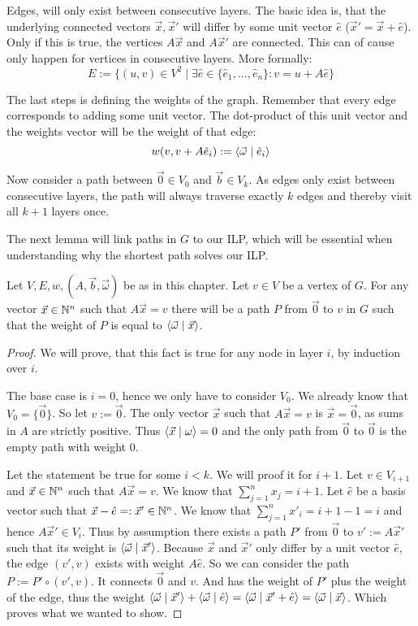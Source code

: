 Edges, will only exist between consecutive layers. The basic idea is, that the underlying connected vectors $\vec x, \vec x'$ will differ by some unit vector $\hat e$ ($\vec x' = \vec x + \hat e$). Only if this is true, the vertices $A\vec x$ and $A\vec x'$ are connected. This can of cause only happen for vertices in consecutive layers. More formally: 
$$E := \{(u, v) \in V^2\mid \exists \hat e \in \{\hat e_1, \dots, \hat e_n\}\colon v = u + A\hat e\}$$

The last steps is defining the weights of the graph. Remember that every edge corresponds to adding some unit vector. The dot-product of this unit vector and the weights vector will be the weight of that edge:
$$w(v, v + A\hat e_i) := \langle \vec \omega \mid \hat e_i \rangle$$

Now consider a path between $\vec 0\in V_0$ and $\vec b \in V_k$. As edges only exist between consecutive layers, the path will always traverse exactly $k$ edges and thereby visit all $k+1$ layers once.

The next lemma will link paths in $G$ to our ILP, which will be essential when understanding why the shortest path solves our ILP.

\begin{lemma}
    Let $V, E, w, (A, \vec b, \vec \omega)$ be as in this chapter. Let $v \in V$ be a vertex of $G$. For any vector $\vec x \in \mathbb{N}^n$ such that $A\vec x = v$ there will be a path $P$ from $\vec 0$ to $v$ in $G$ such that the weight of $P$ is equal to $\langle \vec\omega \mid \vec x \rangle$. 
\end{lemma}
\begin{proof}
    We will prove, that this fact is true for any node in layer $i$, by induction over $i$. 
    
    The base case is $i=0$, hence we only have to consider $V_0$. We already know that $V_0 = \{\vec0\}$. So let $v := \vec 0$. The only vector $\vec x$ such that $A\vec x = v$ is $\vec x = \vec 0$, as sums in $A$ are strictly positive. Thus $\langle \vec x \mid \omega \rangle = 0$ and the only path from $\vec 0$ to $\vec 0$ is the empty path with weight 0.
    
    Let the statement be true for some $i < k$. We will proof it for $i+1$. Let $v \in V_{i+1}$ and $\vec x \in \mathbb{N}^n$ such that $A\vec x = v$. We know that $\sum_{j=1}^n x_j = i+1$. Let $\hat e$ be a basis vector such that $\vec x - \hat e =: \vec x' \in \mathbb{N}^n$. We know that $\sum_{j=1}^{n} x'_i = i+1-1=i$ and hence $A\vec x' \in V_i$. Thus by assumption there exists a path $P'$ from $\vec 0$ to $v' := A\vec x'$ such that its weight is $\langle \vec \omega \mid \vec x' \rangle$. Because $\vec x$ and $\vec x'$ only differ by a unit vector $\hat e$, the edge $(v', v)$ exists with weight $A\hat e$. So we can consider the path $P := P' \circ (v', v)$. It connects $\vec 0$ and $v$. And has the weight of $P'$ plus the weight of the edge, thus the weight $\langle \vec \omega \mid \vec x' \rangle + \langle \vec\omega \mid \hat e \rangle = \langle \vec \omega \mid \vec x' + \hat e \rangle = \langle \vec \omega \mid \vec x \rangle$. Which proves what we wanted to show.
\end{proof}

